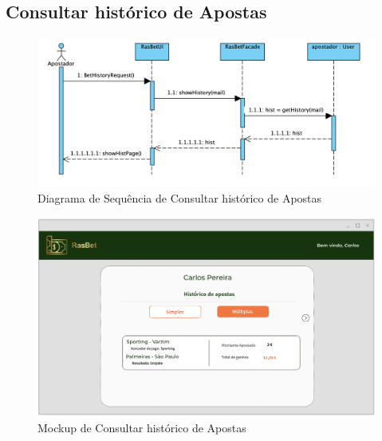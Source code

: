 \subsection{Consultar histórico de Apostas}
\begin{figure}[H]
\centering
\includegraphics[width=1\textwidth]{imagens/ambitoProduto/SconsultaA.png}
\caption{Diagrama de Sequência de Consultar histórico de Apostas}
\end{figure}
\begin{figure}[H]
\centering
\includegraphics[width=1\textwidth]{imagens/ambitoProduto/Mockups/M_HistoricoApostas.png}
\caption{Mockup de Consultar histórico de Apostas}
\end{figure}

